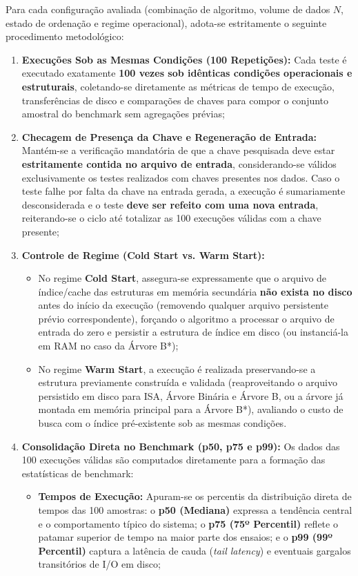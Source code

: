 \documentclass[12pt,a4paper]{article}
\begin{document}
Para cada configuração avaliada (combinação de algoritmo, volume de dados $N$, estado de ordenação e regime operacional), adota-se estritamente o seguinte procedimento metodológico:
\begin{enumerate}
    \item \textbf{Execuções Sob as Mesmas Condições (100 Repetições):} Cada teste é executado exatamente \textbf{100 vezes sob idênticas condições operacionais e estruturais}, coletando-se diretamente as métricas de tempo de execução, transferências de disco e comparações de chaves para compor o conjunto amostral do benchmark sem agregações prévias;
    \item \textbf{Checagem de Presença da Chave e Regeneração de Entrada:} Mantém-se a verificação mandatória de que a chave pesquisada deve estar \textbf{estritamente contida no arquivo de entrada}, considerando-se válidos exclusivamente os testes realizados com chaves presentes nos dados. Caso o teste falhe por falta da chave na entrada gerada, a execução é sumariamente desconsiderada e o teste \textbf{deve ser refeito com uma nova entrada}, reiterando-se o ciclo até totalizar as 100 execuções válidas com a chave presente;
    \item \textbf{Controle de Regime (Cold Start vs. Warm Start):}
    \begin{itemize}
        \item No regime \textbf{Cold Start}, assegura-se expressamente que o arquivo de índice/cache das estruturas em memória secundária \textbf{não exista no disco} antes do início da execução (removendo qualquer arquivo persistente prévio correspondente), forçando o algoritmo a processar o arquivo de entrada do zero e persistir a estrutura de índice em disco (ou instanciá-la em RAM no caso da Árvore B*);
        \item No regime \textbf{Warm Start}, a execução é realizada preservando-se a estrutura previamente construída e validada (reaproveitando o arquivo persistido em disco para ISA, Árvore Binária e Árvore B, ou a árvore já montada em memória principal para a Árvore B*), avaliando o custo de busca com o índice pré-existente sob as mesmas condições.
    \end{itemize}
    \item \textbf{Consolidação Direta no Benchmark (p50, p75 e p99):} Os dados das 100 execuções válidas são computados diretamente para a formação das estatísticas de benchmark:
    \begin{itemize}
        \item \textbf{Tempos de Execução:} Apuram-se os percentis da distribuição direta de tempos das 100 amostras: o \textbf{p50 (Mediana)} expressa a tendência central e o comportamento típico do sistema; o \textbf{p75 (75º Percentil)} reflete o patamar superior de tempo na maior parte dos ensaios; e o \textbf{p99 (99º Percentil)} captura a latência de cauda (\textit{tail latency}) e eventuais gargalos transitórios de I/O em disco;

\end{itemize}
\end{enumerate}
\end{document}
